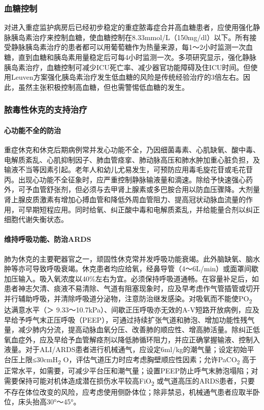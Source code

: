 \subsubsection{血糖控制}

对进入重症监护病房后已经初步稳定的重症脓毒症合并高血糖患者，应使用强化静脉胰岛素治疗来控制血糖，使血糖控制在8.33mmol/L（150mg/dl）以下。所有接受静脉胰岛素治疗的患者都可以用葡萄糖作为热量来源，每1～2小时监测一次血糖，直到血糖和胰岛素用量稳定后可每4小时监测一次。多项研究显示，强化静脉胰岛素治疗，血糖控制可减少ICU死亡率、减少器官功能障碍及住ICU时间。但使用Leuven方案强化胰岛素治疗发生低血糖的风险是传统经验治疗的3倍左右。因此，虽然主张积极控制高血糖，但也需警惕低血糖的发生。

\subsubsection{脓毒性休克的支持治疗}

\paragraph{心功能不全的防治}

重症休克和休克后期病例常并发心功能不全，乃因细菌毒素、心肌缺氧、酸中毒、电解质紊乱、心肌抑制因子、肺血管痉挛、肺动脉高压和肺水肿加重心脏负担，及输液不当等因素引起。老年人和幼儿尤易发生，可预防应用毒毛旋花苷或毛花苷丙。出现心功能不全征象时，应严重控制静脉输液量和滴速。除给予快速强心药外，可予血管舒张剂，但必须与去甲肾上腺素或多巴胺合用以防血压骤降。大剂量肾上腺皮质激素有增加心搏血管和降低外周血管阻力、提高冠状动脉血流量的作用，可早期短程应用。同时给氧、纠正酸中毒和电解质紊乱，并给能量合剂以纠正细胞代谢失衡状态。

\paragraph{维持呼吸功能、防治ARDS}

肺为休克的主要靶器官之一，顽固性休克常并发呼吸功能衰竭。此外脑缺氧、脑水肿等亦可导致呼吸衰竭。休克患者均应给氧，经鼻导管（4～6L/min）或面罩间歇加压输入。吸入氧浓度以40\%左右为宜。必须保持呼吸道通畅。在容量补足后，如患者神志欠清、痰液不易清除、气道有阻塞现象时，应及早考虑作气管插管或切开并行辅助呼吸，并清除呼吸道分泌物，注意防治继发感染。对吸氧而不能使PO\textsubscript{2}
达满意水平（＞
9.33～10.7kPa）、间歇正压呼吸亦无效的A-V短路开放病例，应及早给予呼气末正压呼吸（PEEP），可通过持续扩张气道和肺泡、增加功能性残气量，减少肺内分流，提高动脉血氧分压、改善肺的顺应性、增高肺活量。除纠正低氧血症外，应及早给予血管解痉剂以降低肺循环阻力，并应正确掌握输液、控制入液量。对于ALI/ARDS患者进行机械通气，应设定6ml/kg的潮气量；设定初始平台压上限≤30cmH\textsubscript{2}
O，评估气道压力时应考虑胸壁顺应性因素；允许PaCO\textsubscript{2}
高于正常水平，如需要，可减少平台压和潮气量；设置PEEP防止呼气末肺泡塌陷；对需要保持可能对机体造成潜在损伤水平较高FiO\textsubscript{2}
或气道高压的ARDS患者，只要不存在体位改变的风险，应考虑使用侧卧体位；除非禁忌，机械通气患者应取半卧位，床头抬高30°～45°。

